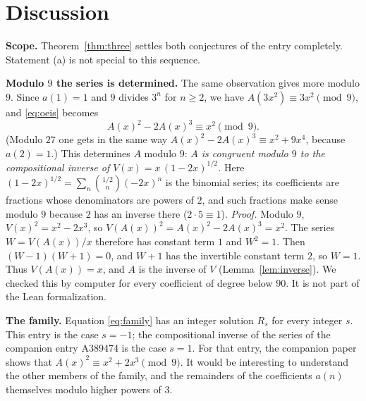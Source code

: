 \documentclass[11pt,a4paper]{article}
\theoremstyle{definition}
\theoremstyle{remark}
\newcommand{\para}[1]{\par\medskip\noindent\textbf{#1}\enspace}
\begin{document}
\section{Discussion}\label{sec:discussion}

\para{Scope.} Theorem~\ref{thm:three} settles both conjectures of the entry completely. Statement (a) is not special to
this sequence.

\para{Modulo $9$ the series is determined.} The same observation gives more modulo $9$. Since $a(1)=1$ and $9$ divides
$3^n$ for $n\ge2$, we have $A(3x^2)\equiv3x^2\pmod 9$, and \eqref{eq:oeis} becomes
\[
A(x)^2-2A(x)^3\equiv x^2\pmod 9 .
\]
(Modulo $27$ one gets in the same way $A(x)^2-2A(x)^3\equiv x^2+9x^4$, because $a(2)=1$.) This determines $A$ modulo
$9$: \emph{$A$ is congruent modulo $9$ to the compositional inverse of $V(x)=x\,(1-2x)^{1/2}$.} Here
$(1-2x)^{1/2}=\sum_n\binom{1/2}{n}(-2x)^n$ is the binomial series; its coefficients are fractions whose denominators are
powers of $2$, and such fractions make sense modulo $9$ because $2$ has an inverse there ($2\cdot5\equiv1$).
\emph{Proof.} Modulo $9$, $V(x)^2=x^2-2x^3$, so $V(A(x))^2=A(x)^2-2A(x)^3=x^2$. The series $W=V(A(x))/x$ therefore has
constant term $1$ and $W^2=1$. Then $(W-1)(W+1)=0$, and $W+1$ has the invertible constant term $2$, so $W=1$. Thus
$V(A(x))=x$, and $A$ is the inverse of $V$ (Lemma~\ref{lem:inverse}). We checked this by computer for every coefficient
of degree below $90$. It is not part of the Lean formalization.

\para{The family.} Equation \eqref{eq:family} has an integer solution $R_s$ for every integer $s$. This entry is the case
$s=-1$; the compositional inverse of the series of the companion entry A389474 is the case $s=1$. For that entry, the
companion paper shows that $A(x)^2\equiv x^2+2x^3\pmod 9$. It would be interesting to understand the other members of
the family, and the remainders of the coefficients $a(n)$ themselves modulo higher powers of $3$.
\end{document}
